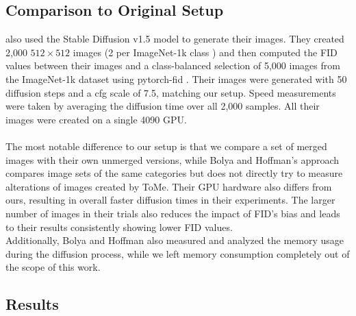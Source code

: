 \subsection{Comparison to Original Setup}
\cite{bolya2023tomesd} also used the Stable Diffusion v1.5 model to generate their images. They created 2,000 $512 \times 512$ images (2 per ImageNet-1k class \cite{deng2009imagenet}) and then computed the FID values between their images and a class-balanced selection of 5,000 images from the ImageNet-1k dataset using pytorch-fid \cite{Seitzer2020FID}. Their images were generated with 50 diffusion steps and a cfg scale of 7.5, matching our setup. Speed measurements were taken by averaging the diffusion time over all 2,000 samples. All their images were created on a single 4090 GPU.\\
\\
The most notable difference to our setup is that we compare a set of merged images with their own unmerged versions, while Bolya and Hoffman's approach compares image sets of the same categories but does not directly try to measure alterations of images created by ToMe. Their GPU hardware also differs from ours, resulting in overall faster diffusion times in their experiments. The larger number of images in their trials also reduces the impact of FID's bias and leads to their results consistently showing lower FID values.\\
Additionally, Bolya and Hoffman also measured and analyzed the memory usage during the diffusion process, while we left memory consumption completely out of the scope of this work.



\subsection{Results}




